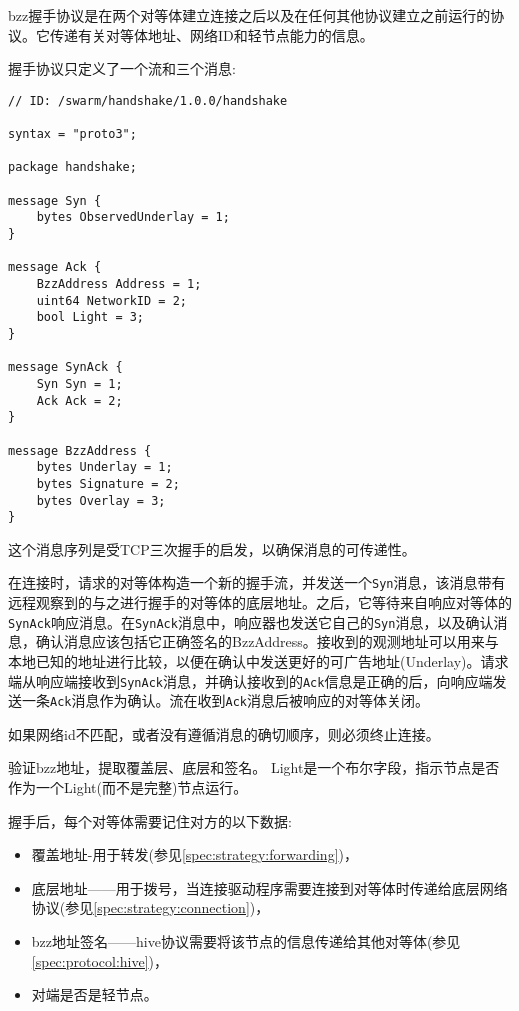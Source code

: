 

bzz握手协议是在两个对等体建立连接之后以及在任何其他协议建立之前运行的协议。它传递有关对等体地址、网络ID和轻节点能力的信息。

握手协议只定义了一个流和三个消息:

\begin{definition}\label{def:bzz-messages}

\begin{lstlisting}
// ID: /swarm/handshake/1.0.0/handshake

syntax = "proto3";

package handshake;

message Syn {
    bytes ObservedUnderlay = 1;
}

message Ack {
    BzzAddress Address = 1;
    uint64 NetworkID = 2;
    bool Light = 3;
}

message SynAck {
    Syn Syn = 1;
    Ack Ack = 2;
}

message BzzAddress {
    bytes Underlay = 1;
    bytes Signature = 2;
    bytes Overlay = 3;
}
\end{lstlisting}
\end{definition}

这个消息序列是受TCP三次握手的启发，以确保消息的可传递性。

在连接时，请求的对等体构造一个新的握手流，并发送一个\lstinline{Syn}消息，该消息带有远程观察到的与之进行握手的对等体的底层地址。之后，它等待来自响应对等体的\lstinline{SynAck}响应消息。在\lstinline{SynAck}消息中，响应器也发送它自己的\lstinline{Syn}消息，以及确认消息，确认消息应该包括它正确签名的BzzAddress。接收到的观测地址可以用来与本地已知的地址进行比较，以便在确认中发送更好的可广告地址(Underlay)。请求端从响应端接收到\lstinline{SynAck}消息，并确认接收到的\lstinline{Ack}信息是正确的后，向响应端发送一条\lstinline{Ack}消息作为确认。流在收到\lstinline{Ack}消息后被响应的对等体关闭。

如果网络id不匹配，或者没有遵循消息的确切顺序，则必须终止连接。

验证bzz地址，提取覆盖层、底层和签名。
Light是一个布尔字段，指示节点是否作为一个Light(而不是完整)节点运行。

握手后，每个对等体需要记住对方的以下数据:

\begin{itemize}
    \item 覆盖地址-用于转发(参见\ref{spec:strategy:forwarding})，
    \item 底层地址——用于拨号，当连接驱动程序需要连接到对等体时传递给底层网络协议(参见\ref{spec:strategy:connection})，
    \item bzz地址签名——hive协议需要将该节点的信息传递给其他对等体(参见\ref{spec:protocol:hive})，
    \item 对端是否是轻节点。
\end{itemize}


